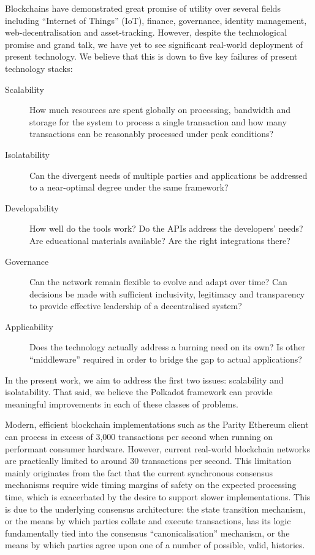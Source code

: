\documentclass[9pt,oneside]{amsart}
\begin{document}
\begin{multicols}{2}
 Blockchains have demonstrated great promise of utility over several fields including ``Internet of Things'' (IoT), finance, governance, identity management, web-decentralisation and asset-tracking. However, despite the technological promise and grand talk, we have yet to see significant real-world deployment of present technology. We believe that this is down to five key failures of present technology stacks:

\begin{description}
\item[Scalability] How much resources are spent globally on processing, bandwidth and storage for the system to process a single transaction and how many transactions can be reasonably processed under peak conditions?
\item[Isolatability] Can the divergent needs of multiple parties and applications be addressed to a near-optimal degree under the same framework?
\item[Developability] How well do the tools work? Do the APIs address the developers' needs? Are educational materials available? Are the right integrations there?
\item[Governance] Can the network remain flexible to evolve and adapt over time? Can decisions be made with sufficient inclusivity, legitimacy and transparency to provide effective leadership of a decentralised system?
\item[Applicability] Does the technology actually address a burning need on its own? Is other ``middleware'' required in order to bridge the gap to actual applications?
\end{description}

 In the present work, we aim to address the first two issues: scalability and isolatability. That said, we believe the Polkadot framework can provide meaningful improvements in each of these classes of problems.

Modern, efficient blockchain implementations such as the Parity Ethereum client\cite{parity} can process in excess of 3,000 transactions per second when running on performant consumer hardware. However, current real-world blockchain networks are practically limited to around 30 transactions per second. This limitation mainly originates from the fact that the current synchronous consensus mechanisms require wide timing margins of safety on the expected processing time, which is exacerbated by the desire to support slower implementations. This is due to the underlying consensus architecture: the state transition mechanism, or the means by which parties collate and execute transactions, has its logic fundamentally tied into the consensus ``canonicalisation'' mechanism, or the means by which parties agree upon one of a number of possible, valid, histories.


\end{multicols}
\end{document}

